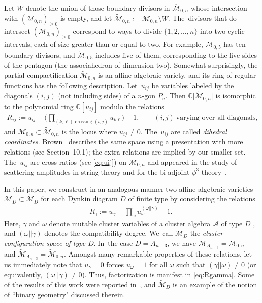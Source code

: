 \documentclass[10pt,a4paper]{amsart}
\def\C{{\mathbb C}}
\def\A{{\mathcal{A}}}
\def\M{{\mathcal{M}}}
\def\tM{{\widetilde {\mathcal{M}}}}
\def\bM{{\overline {\mathcal{M}}}}
\numberwithin{equation}{section}
\begin{document}
Let $W$ denote the union of those boundary divisors in $\bM_{0,n}$ whose intersection with $(\M_{0,n})_{\geq 0}$ is empty, and let $\tM_{0,n}:= \bM_{0,n} \setminus W$. The~divisors that do intersect $(\M_{0,n})_{\geq 0}$ correspond to ways to divide $\{1,2,\dots,n\}$ into two cyclic intervals, each of size greater than or equal to two. For example, $\bM_{0,5}$ has ten boundary divisors, and $\tM_{0,5}$ includes five of them, corresponding to the five sides of the pentagon (the associahedron of dimension two). Somewhat surprisingly, the partial compactification $\tM_{0,n}$ is an affine algebraic variety, and its ring of regular functions has the following description. Let~$u_{ij}$ be variables labeled by the diagonals $(i,j)$ (not including sides) of a $n$-gon $P_n$. Then $\C\big[\tM_{0,n}\big]$ is isomorphic to the polynomial ring $\C[u_{ij}]$ modulo the relations
\begin{gather}\label{eq:Rij}
R_{ij} := u_{ij} + \Bigg(\prod_{(k,\ell) \text{ crossing } (i,j)} u_{k\ell} \Bigg) - 1 , \qquad(i,j) \ \text{varying over all diagonals},
\end{gather}
and $\M_{0,n} \subset \tM_{0,n}$ is the locus where $u_{ij} \neq 0$. The~$u_{ij}$ are called \emph{dihedral coordinates}. Brown~\cite{Brown} describes the same space using a presentation with more relations (see Section~10.1); the extra relations are implied by our smaller set. The~$u_{ij}$ are cross-ratios (see \eqref{eq:uij}) on $\M_{0,n}$ and appeared in the study of scattering amplitudes in string theory and for the bi-adjoint $\phi^3$-theory~\cite{ABHY}.

\bigskip{} In this paper, we construct in an analogous manner two affine algebraic varieties \mbox{$\M_D \!\subset\! \tM_{D}$} for each Dynkin diagram $D$ of finite type by considering the relations
\begin{gather}\label{eq:Rgamma}
R_\gamma := u_\gamma + \prod_{\omega} u_\omega^{(\omega || \gamma)} - 1.
\end{gather}
Here, $\gamma$ and $\omega$ denote mutable cluster variables of a cluster algebra $\A$ of type $D$ \cite{CA2}, and $(\omega || \gamma)$ denotes the compatibility degree. We~call $\M_D$ the \emph{cluster configuration space of type $D$}. In~the case $D = A_{n-3}$, we have $\M_{A_{n-3}} = \M_{0,n}$ and $\tM_{A_{n-3}} = \tM_{0,n}$. Amongst many remarkable properties of these relations, let us immediately note that $u_\gamma = 0$ forces $u_\omega = 1$ for all $\omega$ such that $(\gamma||\omega) \neq 0$ (or equivalently, $(\omega||\gamma)\neq0$). Thus, factorization is manifest in \eqref{eq:Rgamma}. Some of the results of this work were reported in~\cite{AHLT}, and $\tM_D$ is an example of the notion of ``binary geometry" discussed therein.
\end{document}
